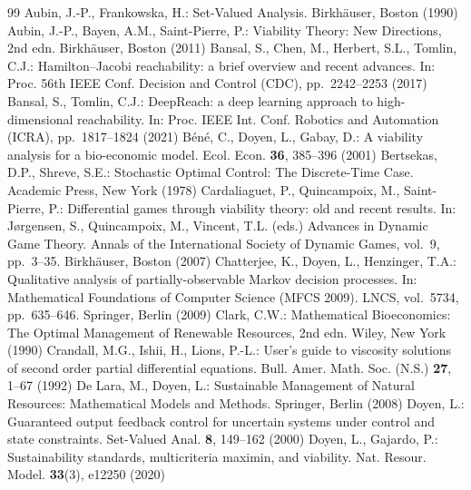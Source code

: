 \begin{thebibliography}{99}
 Aubin, J.-P., Frankowska, H.: Set-Valued Analysis. Birkh\"auser, Boston (1990)
 Aubin, J.-P., Bayen, A.M., Saint-Pierre, P.: Viability Theory: New Directions, 2nd edn. Birkh\"auser, Boston (2011)
 Bansal, S., Chen, M., Herbert, S.L., Tomlin, C.J.: Hamilton--Jacobi reachability: a brief overview and recent advances. In: Proc. 56th IEEE Conf. Decision and Control (CDC), pp.~2242--2253 (2017)
 Bansal, S., Tomlin, C.J.: DeepReach: a deep learning approach to high-dimensional reachability. In: Proc. IEEE Int. Conf. Robotics and Automation (ICRA), pp.~1817--1824 (2021)
 B\'en\'e, C., Doyen, L., Gabay, D.: A viability analysis for a bio-economic model. Ecol. Econ. \textbf{36}, 385--396 (2001)
 Bertsekas, D.P., Shreve, S.E.: Stochastic Optimal Control: The Discrete-Time Case. Academic Press, New York (1978)
 Cardaliaguet, P., Quincampoix, M., Saint-Pierre, P.: Differential games through viability theory: old and recent results. In: J{\o}rgensen, S., Quincampoix, M., Vincent, T.L. (eds.) Advances in Dynamic Game Theory. Annals of the International Society of Dynamic Games, vol.~9, pp.~3--35. Birkh\"auser, Boston (2007)
 Chatterjee, K., Doyen, L., Henzinger, T.A.: Qualitative analysis of partially-observable Markov decision processes. In: Mathematical Foundations of Computer Science (MFCS 2009). LNCS, vol.~5734, pp.~635--646. Springer, Berlin (2009)
 Clark, C.W.: Mathematical Bioeconomics: The Optimal Management of Renewable Resources, 2nd edn. Wiley, New York (1990)
 Crandall, M.G., Ishii, H., Lions, P.-L.: User's guide to viscosity solutions of second order partial differential equations. Bull. Amer. Math. Soc. (N.S.) \textbf{27}, 1--67 (1992)
 De Lara, M., Doyen, L.: Sustainable Management of Natural Resources: Mathematical Models and Methods. Springer, Berlin (2008)
 Doyen, L.: Guaranteed output feedback control for uncertain systems under control and state constraints. Set-Valued Anal. \textbf{8}, 149--162 (2000)
 Doyen, L., Gajardo, P.: Sustainability standards, multicriteria maximin, and viability. Nat. Resour. Model. \textbf{33}(3), e12250 (2020)

\end{thebibliography}

